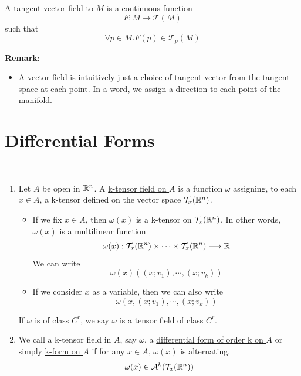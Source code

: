 \begin{definition}
    A \underline{tangent vector field to $M$} is a continuous function 
    $$F:M\longrightarrow \mathcal{T}(M)$$
    such that $$\forall p\in M. F(p)\in \mathcal{T}_p(M)$$
\end{definition}
\noindent\textbf{Remark}:
\begin{itemize}
    \item A vector field is intuitively just a choice of tangent vector from the tangent space at each point. In a word, we assign a direction to each point of the manifold.
\end{itemize}

\section{Differential Forms}

\begin{definition}\
    \begin{enumerate}
        \item Let $A$ be open in $\mathbb{R}^n$. A \underline{k-tensor field on $A$} is a function $\omega$ assigning, to each $x\in A$, a k-tensor defined on the vector space $\mathcal{T}_x(\mathbb{R}^n)$.
        \begin{itemize}
            \item If we fix $x\in A$, then $\omega(x)$ is a k-tensor on $\mathcal{T}_x(\mathbb{R}^n)$. In other words, $\omega(x)$ is a multilinear function 
            $$\omega(x):\mathcal{T}_x(\mathbb{R}^n)\times \cdots \times \mathcal{T}_x(\mathbb{R}^n)\longrightarrow \mathbb{R}$$
            We can write $$\omega(x)((x;v_1),\cdots,(x;v_k))$$
            \item If we consider $x$ as a variable, then
            we can also write $$\omega(x,(x;v_1),\cdots,(x;v_k))$$
        \end{itemize}
        If $\omega$ is of class $C^r$, we say $\omega$ is a \underline{tensor field of class $C^r$}.
        \item We call a k-tensor field in $A$, say $\omega$, a \underline{differential form of order k on $A$} or simply \underline{k-form on $A$} if for any $x\in A$, $\omega(x)$ is alternating. $$\omega(x)\in \mathcal{A}^k(\mathcal{T}_x(\mathbb{R}^n))$$
    \end{enumerate}
\end{definition}

